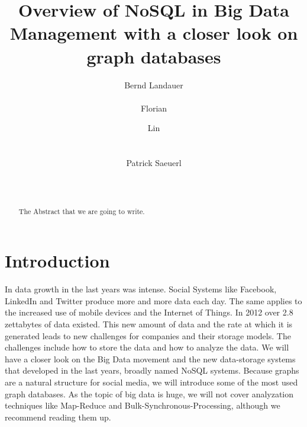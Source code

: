 \documentclass{acm_proc_article-sp}
\begin{document}
\title{Overview of NoSQL in Big Data Management with a closer look on graph databases }

\author{
\alignauthor
Bernd Landauer\\
       \\
\alignauthor Florian
       \\
\and
\alignauthor Lin
       \\
       \\
       \\
\alignauthor Patrick Saeuerl\\
       \\
	   \\
}


\maketitle
\begin{abstract}
The Abstract that we are going to write.
\end{abstract}

\section{Introduction}

In data growth in the last years was intense. Social Systems like Facebook, LinkedIn and Twitter produce more and more data each day. The same applies to the increased use of mobile devices and the Internet of Things. In 2012 over 2.8 zettabytes of data existed.
This new amount of data and the rate at which it is generated leads to new challenges for companies and their storage models. The challenges include how to store the data and how to analyze the data. We will have a closer look on the Big Data movement and the new data-storage systems that developed in the last years, broadly named NoSQL systems. Because graphs are a natural structure for social media, we will introduce some of the most used graph databases. As the topic of big data is huge, we will not cover analyzation techniques like Map-Reduce and Bulk-Synchronous-Processing, although we recommend reading them up.
\end{document}
